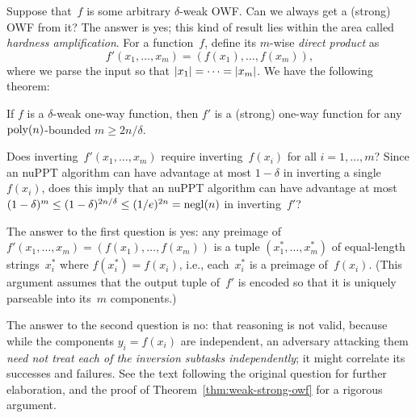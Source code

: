 \documentclass[11pt]{article}
\begin{document}
Suppose that~$f$ is some arbitrary $\delta$-weak OWF.  Can we always
get a (strong) OWF from it?  The answer is yes; this kind of result
lies within the area called \emph{hardness amplification}.  For a
function~$f$, define its $m$-wise \emph{direct product} as
\[ f'(x_{1}, \ldots, x_{m}) = (f(x_{1}), \ldots, f(x_{m})), \] where
we parse the input so that $\lvert x_{1}\rvert = \cdots = \lvert x_{m}\rvert$.  We
have the following theorem:

\begin{theorem}
  \label{thm:weak-strong-owf}
  If $f$ is a $\delta$-weak one-way function, then $f'$ is a (strong)
  one-way function for any $\operatorname{poly}(n)$-bounded $m \geq 2n/\delta$.
\end{theorem}

\begin{question}
  Does inverting~$f'(x_{1}, \ldots, x_{m})$ require
  inverting~$f(x_{i})$ for all $i=1,\ldots,m$?  Since an nuPPT
  algorithm can have advantage at most $1-\delta$ in inverting a
  single~$f(x_{i})$, does this imply that an nuPPT algorithm can have
  advantage at most
  $(1-\delta)^{m} \leq (1-\delta)^{2n/\delta} \leq (1/e)^{2n} =
  \operatorname{negl}(n)$ in inverting~$f'$?
\end{question}

\begin{answer}
  The answer to the first question is yes: any preimage of
  $f'(x_{1}, \ldots, x_{m}) = (f(x_{1}), \ldots, f(x_{m}))$ is a tuple
  $(x_{1}^{*}, \ldots, x_{m}^{*})$ of equal-length strings~$x_{i}^{*}$
  where $f(x_{i}^{*}) = f(x_{i})$, i.e., each~$x_{i}^{*}$ is a
  preimage of~$f(x_{i})$. (This argument assumes that the output
  tuple of~$f'$ is encoded so that it is uniquely parseable into
  its~$m$ components.)

  The answer to the second question is no: that reasoning is not
  valid, because while the components $y_{i} = f(x_{i})$ are
  independent, an adversary attacking them \emph{need not treat each
    of the inversion subtasks independently}; it might correlate its
  successes and failures. See the text following the original question
  for further elaboration, and the proof of
  Theorem~\ref{thm:weak-strong-owf} for a rigorous argument.
\end{answer}
\end{document}
